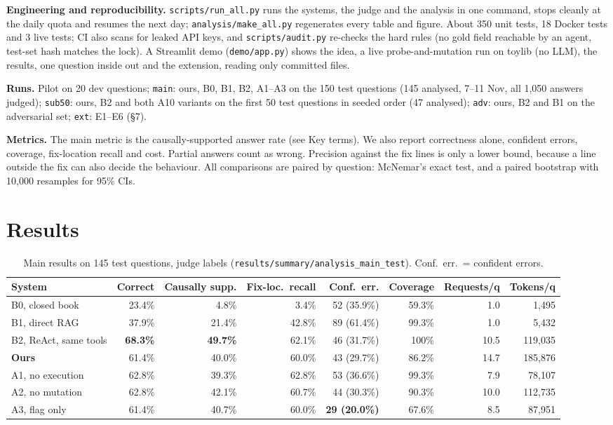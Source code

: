 \documentclass[10pt,a4paper]{article}
\newcommand{\code}[1]{\texttt{\small #1}}
\begin{document}
\textbf{Engineering and reproducibility.} \code{scripts/run\_all.py} runs the systems, the judge and the analysis in
one command, stops cleanly at the daily quota and resumes the next day; \code{analysis/make\_all.py} regenerates every
table and figure. About 350 unit tests, 18 Docker tests and 3 live tests; CI also scans for leaked API keys, and
\code{scripts/audit.py} re-checks the hard rules (no gold field reachable by an agent, test-set hash matches the lock).
A Streamlit demo (\code{demo/app.py}) shows the idea, a live probe-and-mutation run on toylib (no LLM), the results,
one question inside out and the extension, reading only committed files.

\textbf{Runs.} Pilot on 20 dev questions; \code{main}: ours, B0, B1, B2, A1--A3 on the 150 test questions (145
analysed, 7--11 Nov, all 1,050 answers judged); \code{sub50}: ours, B2 and both A10 variants on the first 50 test
questions in seeded order (47 analysed); \code{adv}: ours, B2 and B1 on the adversarial set; \code{ext}: E1--E6 (\S7).

\textbf{Metrics.} The main metric is the causally-supported answer rate (see Key terms). We also report
correctness alone, confident errors, coverage, fix-location recall and cost. Partial answers count as wrong. Precision
against the fix lines is only a lower bound, because a line outside the fix can also decide the behaviour. All
comparisons are paired by question: McNemar's exact test, and a paired bootstrap with 10,000 resamples for 95\% CIs.

\section{Results}

\begin{table}[!htb]
\centering\small
\caption{Main results on 145 test questions, judge labels (\code{results/summary/analysis\_main\_test}). Conf.\ err.\ =
confident errors.}
\setlength{\tabcolsep}{3.6pt}
\begin{tabular}{lrrrrrrr}
\toprule
System & Correct & Causally supp. & Fix-loc.\ recall & Conf.\ err. & Coverage & Requests/q & Tokens/q\\
\midrule
B0, closed book & 23.4\% & 4.8\% & 3.4\% & 52 (35.9\%) & 59.3\% & 1.0 & 1,495\\
B1, direct RAG & 37.9\% & 21.4\% & 42.8\% & 89 (61.4\%) & 99.3\% & 1.0 & 5,432\\
B2, ReAct, same tools & \textbf{68.3\%} & \textbf{49.7\%} & 62.1\% & 46 (31.7\%) & 100\% & 10.5 & 119,035\\
\textbf{Ours} & 61.4\% & 40.0\% & 60.0\% & 43 (29.7\%) & 86.2\% & 14.7 & 185,876\\
A1, no execution & 62.8\% & 39.3\% & 62.8\% & 53 (36.6\%) & 99.3\% & 7.9 & 78,107\\
A2, no mutation & 62.8\% & 42.1\% & 60.7\% & 44 (30.3\%) & 90.3\% & 10.0 & 112,735\\
A3, flag only & 61.4\% & 40.7\% & 60.0\% & \textbf{29 (20.0\%)} & 67.6\% & 8.5 & 87,951\\
\bottomrule
\end{tabular}
\end{table}
\end{document}
